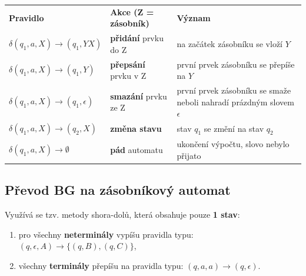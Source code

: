 \begin{table}[H]
	\vspace{-2mm}
	\centering
	\begin{tabular}{l|l|p{6.5cm}}
		\textbf{Pravidlo} & \textbf{Akce (Z = zásobník)} & \textbf{Význam} \\\hhline
		$ \delta(q_1, a, X) \rightarrow (q_1, YX) $ 	&                 \textbf{přidání} prvku do Z & na začátek zásobníku se vloží $Y$ \\ 
		$ \delta(q_1, a, X) \rightarrow (q_1, Y) $	&                  \textbf{přepsání} prvku v Z & první prvek zásobníku se přepíše na $Y$ \\ 
		$ \delta(q_1, a, X) \rightarrow (q_1, \epsilon) $	&                  \textbf{smazání} prvku ze Z & první prvek zásobníku se smaže neboli nahradí prázdným slovem $\epsilon$ \\ 
		$ \delta(q_1, a, X)\rightarrow(q_2, X) $	&                  \textbf{změna stavu}& stav $ q_1 $ se změní na stav $ q_2 $ \\ 
		$\delta(q_1, a, X)\rightarrow\emptyset$	&                  \textbf{pád} automatu & ukončení výpočtu, slovo nebylo přijato \\ 
	\end{tabular}
\end{table}

\subsection{Převod BG na zásobníkový automat}
Využívá se tzv. metody shora-dolů, která obsahuje pouze \textbf{1 stav}:
\begin{enumerate}
\item pro všechny \textbf{neterminály} vypíšu pravidla typu: $(q, \epsilon, A) \rightarrow \{(q, B), (q, C)\}$,
\item všechny \textbf{terminály} přepíšu na pravidla typu: $(q, a, a) \rightarrow (q, \epsilon)$.
\end{enumerate}

